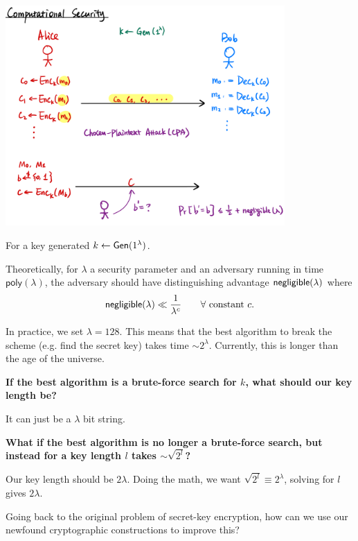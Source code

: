 \begin{center}
    \includegraphics[width=0.8\textwidth]{images/2023-01-31/computational-security.png}
\end{center}

For a key generated $k\leftarrow \operatorname{\mathsf{Gen}}(1^\lambda)$.

Theoretically, for $\lambda$ a security parameter and an adversary running in time $\mathsf{poly}(\lambda)$, the adversary should have distinguishing advantage $\operatorname{\mathsf{negligible}}(\lambda)$ where
\[\operatorname{\mathsf{negligible}}(\lambda) \ll \frac{1}{\lambda^c}\qquad \forall\text{ constant }c.\]

In practice, we set $\lambda = 128$. This means that the best algorithm to break the scheme (e.g. find the secret key) takes time $\sim 2^\lambda$. Currently, this is longer than the age of the universe.

\begin{example}
    \textbf{If the best algorithm is a brute-force search for $k$, what should our key length be?}

    It can just be a $\lambda$ bit string.
\end{example}
\begin{example*}
    \textbf{What if the best algorithm is no longer a brute-force search, but instead for a key length $l$ takes $\sim \sqrt{2^l}$?}

    Our key length should be $2\lambda$. Doing the math, we want $\sqrt{2^l} \equiv 2^\lambda$, solving for $l$ gives $2\lambda$.
\end{example*}

Going back to the original problem of secret-key encryption, how can we use our newfound cryptographic constructions to improve this?

